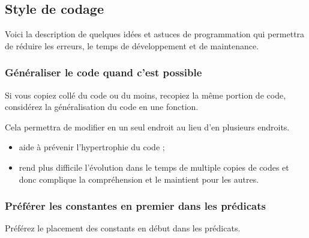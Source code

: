 \subsection{Style de codage}
Voici la description de quelques idées et astuces de programmation qui permettra de réduire les erreurs, le temps de développement et de maintenance.

\subsubsection{Généraliser le code quand c'est possible}

Si vous copiez collé du code ou du moins, recopiez la même portion de code, considérez la généralisation du code en une fonction.

Cela permettra de modifier en un seul endroit au lieu d'en plusieurs endroits.

\begin{itemize}
\item aide à prévenir l'hypertrophie du code ;
\item rend plus difficile l'évolution dans le temps de multiple copies de codes et donc complique la compréhension et le maintient pour les autres.
\end{itemize}

\subsubsection{Préférer les constantes en premier dans les prédicats}
Préférez le placement des constants en début dans les prédicats.

